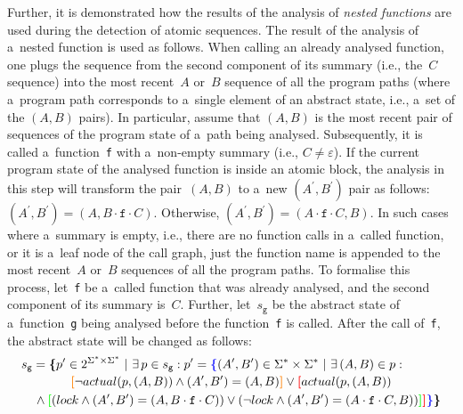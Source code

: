 Further, it is demonstrated how the results of the analysis of \emph{nested functions} are used during the detection of atomic sequences. The result of the analysis of a~nested function is used as follows. When calling an already analysed function, one plugs the sequence from the second component of its summary (i.e., the~$ C $ sequence) into the most recent~$ A $ or~$ B $ sequence of all the program paths (where a~program path corresponds to a~single element of an abstract state, i.e., a~set of the $ (A, B) $ pairs). In particular, assume that $ (A, B) $ is the most recent pair of sequences of the program state of a~path being analysed. Subsequently, it is called a~function~\texttt{f} with a~non-empty summary (i.e., $ C \neq \varepsilon $). If the current program state of the analysed function is inside an atomic block, the analysis in this step will transform the pair~$ (A, B) $ to a~new $ (A^\prime, B^\prime) $ pair as follows: $ (A^\prime, B^\prime) = (A, B \cdot \mathtt{f} \cdot C) $. Otherwise, $ (A^\prime, B^\prime) = (A \cdot \mathtt{f} \cdot C, B) $. In such cases where a~summary is empty, i.e., there are no function calls in a~called function, or it is a~leaf node of the call graph, just the function name is appended to the most recent~$ A $ or~$ B $ sequences of all the program paths. To formalise this process, let~\texttt{f} be a~called function that was already analysed, and the second component of its summary is~$ C $. Further, let~$ s_\mathtt{g} $ be the abstract state of a~function~\texttt{g} being analysed before the function~\texttt{f} is called. After the call of~\texttt{f}, the abstract state will be changed as follows:
$$
\begin{multlined}
    s_\mathtt{g} = \bb{\{}p^\prime \in 2^{\Sigma^* \times \Sigma^*}\ |\ \exists\,p \in s_\mathtt{g} : p^\prime = \bA{\{}(A^\prime, B^\prime) \in \Sigma^* \times \Sigma^*\ |\ \exists\,(A, B) \in p : \\
%
    \bB{[}\neg actual(p, (A, B)) \wedge (A^\prime, B^\prime) = (A, B)\bB{]} \vee \bC{[}actual(p, (A, B)) \\
%
    \wedge \bD{[}(lock \wedge (A^\prime, B^\prime) = (A, B \cdot \mathtt{f} \cdot C)) \vee (\neg lock \wedge (A^\prime, B^\prime) = (A \cdot \mathtt{f} \cdot C, B))%
%
    \bD{]}\bC{]}\bA{\}}\bb{\}}
\end{multlined}
$$

